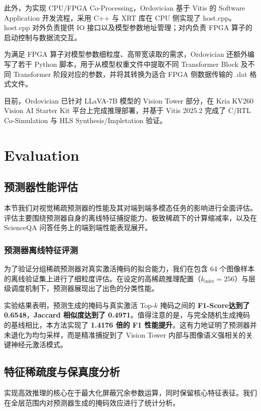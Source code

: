 \documentclass[sigconf]{acmart}
\begin{document}
	此外，为实现 CPU/FPGA Co-Processing，Ordovician 基于 Vitis 的 Software Application 开发流程，采用 C++ 与 XRT 库在 CPU 侧实现了 host.cpp。host.cpp 对外负责提供 IO 接口以及模型参数地址管理；对内负责 FPGA 算子的启动控制与数据流交互。

	为满足 FPGA 算子对模型参数细粒度、高带宽读取的需求，Ordovician 还额外编写了若干 Python 脚本，用于从模型权重文件中提取不同 Transformer Block 及不同 Transformer 阶段对应的参数，并将其转换为适合 FPGA 侧数据传输的 .dat 格式文件。

	目前，Ordovician 已针对 LLaVA-7B 模型的 Vision Tower 部分，在 Kria KV260 Vision AI Starter Kit 平台上完成推理部署，并基于 Vitis 2025.2 完成了 C/RTL Co-Simulation 与 HLS Synthesis/Impletation 验证。
	
	\section{Evaluation}
	\subsection{预测器性能评估}

本节我们对视觉稀疏预测器的性能及其对端到端多模态任务的影响进行全面评估。评估主要围绕预测器自身的离线特征捕捉能力、极致稀疏下的计算缩减率，以及在 ScienceQA 问答任务上的端到端性能表现展开。

\subsubsection{预测器离线特征评测}
为了验证分组稀疏预测器对真实激活掩码的拟合能力，我们在包含 64 个图像样本的离线验证集上进行了细粒度评估。在设定的高稀疏推理配置（$k_{\mathrm{infer}}=256$）与层级调度机制下，预测器展现出了出色的分类性能。

实验结果表明，预测生成的掩码与真实激活 Top-$k$ 掩码之间的 \textbf{F1-Score达到了 0.6548}，\textbf{Jaccard 相似度达到了 0.4971}。值得注意的是，与完全随机生成掩码的基线相比，本方法实现了 \textbf{1.4176 倍的 F1 性能提升}。这有力地证明了预测器并未退化为均匀采样，而是精准捕捉到了 Vision Tower 内部与图像语义强相关的关键神经元激活模式。

\subsection{特征稀疏度与保真度分析 }
实现高效推理的核心在于最大化屏蔽冗余参数运算，同时保留核心特征表征。我们在全层范围内对预测器生成的掩码效应进行了统计分析。
\end{document}
